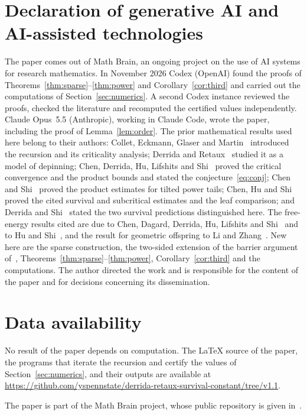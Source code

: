 \documentclass[11pt]{amsart}
\theoremstyle{remark}
\numberwithin{equation}{section}
\begin{document}
\section*{Declaration of generative AI and AI-assisted technologies}
The paper comes out of Math Brain, an ongoing project on the use of AI systems for research mathematics. In November 2026 Codex (OpenAI) found the proofs of Theorems~\ref{thm:sparse}--\ref{thm:power} and Corollary~\ref{cor:third} and carried out the computations of Section~\ref{sec:numerics}. A second Codex instance reviewed the proofs, checked the literature and recomputed the certified values independently. Claude Opus~5.5 (Anthropic), working in Claude Code, wrote the paper, including the proof of Lemma~\ref{lem:order}. The prior mathematical results used here belong to their authors: Collet, Eckmann, Glaser and Martin~\cite{CEGM} introduced the recursion and its criticality analysis; Derrida and Retaux~\cite{DR} studied it as a model of depinning; Chen, Derrida, Hu, Lifshits and Shi~\cite{CDHLS} proved the critical convergence and the product bounds and stated the conjecture~\eqref{eq:conj}; Chen and Shi~\cite{CS} proved the product estimates for tilted power tails; Chen, Hu and Shi~\cite{CHS22,CHS24} proved the cited survival and subcritical estimates and the leaf comparison; and Derrida and Shi~\cite{DS} stated the two survival predictions distinguished here. The free-energy results cited are due to Chen, Dagard, Derrida, Hu, Lifshits and Shi~\cite{CDDHLS} and to Hu and Shi~\cite{HS}, and the result for geometric offspring to Li and Zhang~\cite{LZ}. New here are the sparse construction, the two-sided extension of the barrier argument of~\cite{Sh}, Theorems~\ref{thm:sparse}--\ref{thm:power}, Corollary~\ref{cor:third} and the computations. The author directed the work and is responsible for the content of the paper and for decisions concerning its dissemination.

\section*{Data availability}
No result of the paper depends on computation. The \LaTeX{} source of the paper, the programs that iterate the recursion and certify the values of Section~\ref{sec:numerics}, and their outputs are available at\\ \url{https://github.com/yspennstate/derrida-retaux-survival-constant/tree/v1.1}.

The paper is part of the Math Brain project, whose public repository is given in~\cite{MathBrainRepo}.
\end{document}
